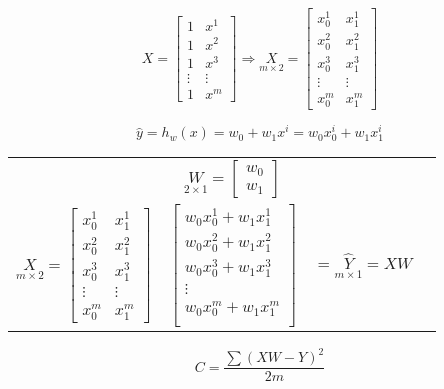 \documentclass[12pt]{article}
\begin{document}
\begin{equation}
X=\left[
\begin{matrix}
	1 & x^{1}\\
	1 & x^{2}\\
	1 & x^{3}\\
	\vdots & \vdots\\
	1 & x^{m}
\end{matrix} \right] \Rightarrow
\underset{m\times 2}{X}=\left[
\begin{matrix}
	x_{0}^{1} & x_{1}^{1}\\
	x_{0}^{2} & x_{1}^{2}\\
	x_{0}^{3} & x_{1}^{3}\\
	\vdots &\vdots\\
	x_{0}^{m} & x_{1}^{m}
\end{matrix} \right]
\end{equation}

\begin{equation}
\hat{y}=h_{w}(x)=w_{0}+w_{1}x^{i} = w_{0}x_{0}^{i}+w_{1}x_{1}^{i}
\end{equation}

\begin{center}
\begin{tabular}{l*{2}{c}r}
\  
& 
$
\underset{2\times 1}{W}=\left[
\begin{matrix}
	w_{0}\\
	w_{1}
\end{matrix} \right]
$
\\
$
\underset{m\times 2}{X}=\left[
\begin{matrix}
	x_{0}^{1} & x_{1}^{1}\\
	x_{0}^{2} & x_{1}^{2}\\
	x_{0}^{3} & x_{1}^{3}\\
	\vdots &\vdots\\
	x_{0}^{m} & x_{1}^{m}
\end{matrix} \right]
$
& 
$
\left[
\begin{matrix}
	w_{0}x_{0}^{1}+w_{1}x_{1}^{1}\\
	w_{0}x_{0}^{2}+w_{1}x_{1}^{2}\\
	w_{0}x_{0}^{3}+w_{1}x_{1}^{3}\\
	\vdots\\
	w_{0}x_{0}^{m}+w_{1}x_{1}^{m}\\
\end{matrix} \right]
$
&
$
= \underset{m\times 1}{\hat{Y}}=XW
$
\\
\end{tabular}
\end{center}
\begin{equation}
C=\frac{\sum(XW-Y)^2}{2m}
\end{equation}
\end{document}
